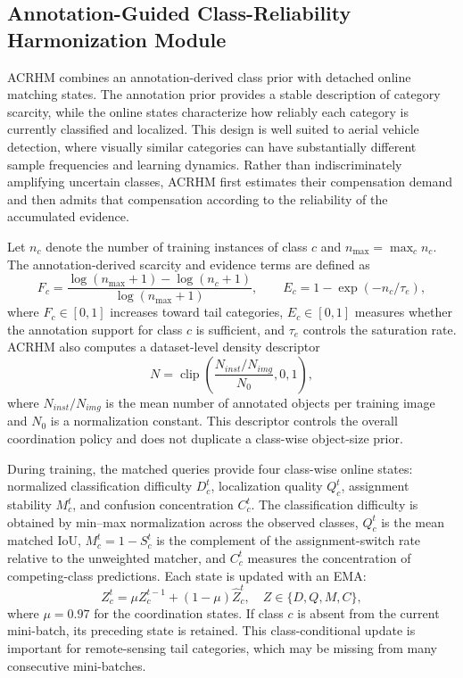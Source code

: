 \documentclass[letterpaper,journal]{IEEEtran}
\begin{document}
\subsection{Annotation-Guided Class-Reliability Harmonization Module}
\label{sec:acrhm}
ACRHM combines an annotation-derived class prior with detached online matching states. The annotation prior provides a stable description of category scarcity, while the online states characterize how reliably each category is currently classified and localized. This design is well suited to aerial vehicle detection, where visually similar categories can have substantially different sample frequencies and learning dynamics. Rather than indiscriminately amplifying uncertain classes, ACRHM first estimates their compensation demand and then admits that compensation according to the reliability of the accumulated evidence.

Let $n_c$ denote the number of training instances of class $c$ and $n_{\max}=\max_c n_c$. The annotation-derived scarcity and evidence terms are defined as
\begin{equation}
F_c=\frac{\log(n_{\max}+1)-\log(n_c+1)}{\log(n_{\max}+1)},
\qquad
E_c=1-\exp(-n_c/\tau_e),
\end{equation}
where $F_c\in[0,1]$ increases toward tail categories, $E_c\in[0,1]$ measures whether the annotation support for class $c$ is sufficient, and $\tau_e$ controls the saturation rate. ACRHM also computes a dataset-level density descriptor
\begin{equation}
N=\operatorname{clip}\left(
\frac{N_{inst}/N_{img}}{N_0},0,1\right),
\end{equation}
where $N_{inst}/N_{img}$ is the mean number of annotated objects per training image and $N_0$ is a normalization constant. This descriptor controls the overall coordination policy and does not duplicate a class-wise object-size prior.

During training, the matched queries provide four class-wise online states: normalized classification difficulty $D_c^t$, localization quality $Q_c^t$, assignment stability $M_c^t$, and confusion concentration $C_c^t$. The classification difficulty is obtained by min--max normalization across the observed classes, $Q_c^t$ is the mean matched IoU, $M_c^t=1-S_c^t$ is the complement of the assignment-switch rate relative to the unweighted matcher, and $C_c^t$ measures the concentration of competing-class predictions. Each state is updated with an EMA:
\begin{equation}
Z_c^t=\mu Z_c^{t-1}+(1-\mu)\hat Z_c^t,
\quad Z\in\{D,Q,M,C\},
\end{equation}
where $\mu=0.97$ for the coordination states. If class $c$ is absent from the current mini-batch, its preceding state is retained. This class-conditional update is important for remote-sensing tail categories, which may be missing from many consecutive mini-batches.
\end{document}
